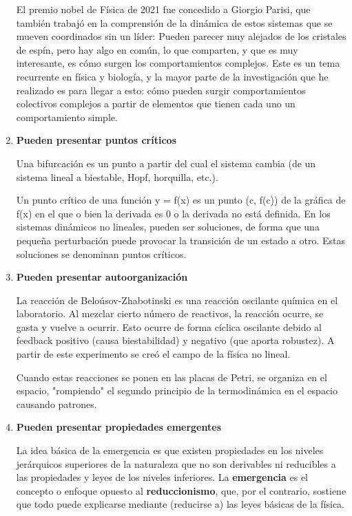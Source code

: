 \begin{enumerate}
El premio nobel de Física de 2021 fue concedido a Giorgio Parisi, que también trabajó en la comprensión de la dinámica de estos sistemas que se mueven coordinados sin un líder: Pueden parecer muy alejados de los cristales de espín, pero hay algo en común, lo que comparten, y que es muy interesante, es cómo surgen los comportamientos complejos. Este es un tema recurrente en física y biología, y la mayor parte de la investigación que he realizado es para llegar a esto: cómo pueden surgir comportamientos colectivos complejos a partir de elementos que tienen cada uno un comportamiento simple.

\item \textbf{Pueden presentar puntos críticos}

Una bifurcación es un punto a partir del cual el sistema cambia (de un sistema lineal a biestable, Hopf, horquilla, etc.).

Un punto crítico de una función y = f(x) es un punto (c, f(c)) de la gráfica de f(x) en el que o bien la derivada es 0 o la derivada no está definida. En los sistemas dinámicos no lineales, pueden ser soluciones, de forma que una pequeña perturbación puede provocar la transición de un estado a otro. Estas soluciones se denominan puntos críticos.

\item \textbf{Pueden presentar autoorganización}

La reacción de Beloúsov-Zhabotinski es una reacción oscilante química en el laboratorio. Al mezclar cierto número de reactivos, la reacción ocurre, se gasta y vuelve a ocurrir. Esto ocurre de forma cíclica oscilante debido al feedback positivo (causa biestabilidad) y negativo (que aporta robustez). A partir de este experimento se creó el campo de la física no lineal.

Cuando estas reacciones se ponen en las placas de Petri, se organiza en el espacio, "rompiendo" el segundo principio de la termodinámica en el espacio causando patrones. 

\item \textbf{Pueden presentar propiedades emergentes}

La idea básica de la emergencia es que existen propiedades en los niveles jerárquicos superiores de la naturaleza que no son derivables ni reducibles a las propiedades y leyes de los niveles inferiores. La \textbf{emergencia} es el concepto o enfoque opuesto al \textbf{reduccionismo}, que, por el contrario, sostiene que todo puede explicarse mediante (reducirse a) las leyes básicas de la física. 


\end{enumerate}
